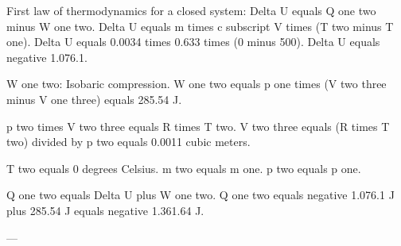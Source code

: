 First law of thermodynamics for a closed system:  
Delta U equals Q one two minus W one two.  
Delta U equals m times c subscript V times (T two minus T one).  
Delta U equals 0.0034 times 0.633 times (0 minus 500).  
Delta U equals negative 1.076.1.  

W one two: Isobaric compression.  
W one two equals p one times (V two three minus V one three) equals 285.54 J.  

p two times V two three equals R times T two.  
V two three equals (R times T two) divided by p two equals 0.0011 cubic meters.  

T two equals 0 degrees Celsius.  
m two equals m one.  
p two equals p one.  

Q one two equals Delta U plus W one two.  
Q one two equals negative 1.076.1 J plus 285.54 J equals negative 1.361.64 J.  

---